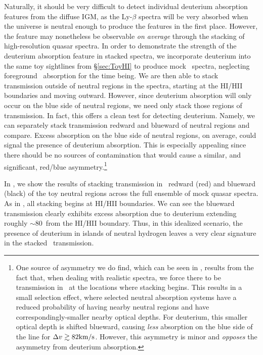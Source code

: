 Naturally, it should be very difficult to detect individual deuterium absorption features from the diffuse IGM, as the Ly-$\beta$ spectra will be very absorbed when the universe is neutral enough to
produce the features in the first place. However, the feature may nonetheless be observable \textit{on average} through the stacking of high-resolution quasar spectra. 
In order to demonstrate the strength of the deuterium absorption feature in stacked spectra, we incorporate deuterium into the same toy sightlines from \S \ref{sec:ToyHI} to produce mock \lyb\ spectra, neglecting foreground \lya\ absorption for the time being. We are then able to stack transmission outside of neutral regions in the spectra, starting at the HI/HII boundaries and moving outward. However, since deuterium absorption will only occur on the blue side of neutral regions, we need only stack those regions of transmission. In fact, this offers a clean test for detecting deuterium. Namely, we can separately stack transmission redward and blueward of neutral regions and compare. Excess absorption on the blue side of neutral regions, on average, could signal the presence of deuterium absorption. This is especially appealing since there should be no sources of contamination that would cause a similar, and significant, red/blue asymmetry.\footnote{One source of asymmetry we do find, which can be seen in , results from the fact that, when dealing with realistic spectra, we force there to be transmission in \lyb\ at the locations where stacking begins. This results in a small selection effect, where selected neutral absorption systems have a reduced probability of having nearby neutral regions and have correspondingly-smaller nearby optical depths. For deuterium, this smaller optical depth is shifted blueward, causing \textit{less} absorption on the blue side of the line for $\Delta v \gtrsim 82\text{km}/\text{s}$. However, this asymmetry is minor and {\it opposes} the asymmetry from deuterium absorption.}


In , we show the results of stacking transmission in \lyb\ redward (red) and blueward (black) of the toy neutral regions across the full ensemble of mock quasar spectra. As in , all stacking begins at HI/HII boundaries. We can see the blueward transmission clearly exhibits excess absorption due to deuterium extending roughly $\sim$80\kms\ from the HI/HII boundary. Thus, in this idealized scenario, the presence of deuterium in islands of neutral hydrogen leaves a very clear signature in the stacked \lyb\ transmission.

